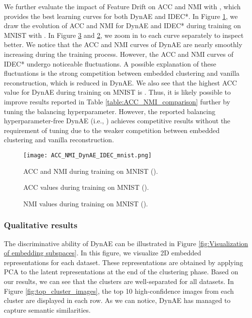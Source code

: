 \documentclass{article}
\begin{document}
We further evaluate the impact of Feature Drift on ACC and NMI with , which provides the best learning curves for both DynAE and IDEC*. In Figure \ref{fig:ACC_NMI_tunned_mnist}, we draw the evolution of ACC and NMI for DynAE and IDEC* during training on MNIST with . In Figure \ref{fig:NMI_tuned_MNIST} and \ref{fig:ACC_tuned_MNIST}, we zoom in to each curve separately to inspect better. We notice that the ACC and NMI curves of DynAE are nearly smoothly increasing during the training process. However, the ACC and NMI curves of IDEC* undergo noticeable fluctuations. A possible explanation of these fluctuations is the strong competition between embedded clustering and vanilla reconstruction, which is reduced in DynAE. We also see that the highest ACC value for DynAE during training on MNIST is . Thus, it is likely possible to improve results reported in Table \ref{table:ACC_NMI_comparison} further by tuning the balancing hyperparameter. However, the reported balancing hyperparameter-free DynAE (i.e., ) achieves competitive results without the requirement of tuning due to the weaker competition between embedded clustering and vanilla reconstruction.

\begin{figure}
\vskip 0.2in
\begin{center}
\centerline{\texttt{[image: ACC\_NMI\_DynAE\_IDEC\_mnist.png]}}
\caption{ACC and NMI during training on MNIST ().}
\label{fig:ACC_NMI_tunned_mnist}
\end{center}
\vskip -0.2in
\end{figure}

\begin{figure}
\vskip 0.2in
\centering
    \caption{ACC values during training on MNIST ().}
\vskip -0.2in
\label{fig:ACC_tuned_MNIST}
\end{figure}

\begin{figure}
\vskip 0.2in
\centering
    \caption{NMI values during training on MNIST ().}
\vskip -0.2in
\label{fig:NMI_tuned_MNIST}
\end{figure}

\subsubsection{Qualitative results}
The discriminative ability of DynAE can be illustrated in Figure \ref{fig:Visualization of embedding subspaces}. In this figure, we visualize 2D embedded representations for each dataset. These representations are obtained by applying PCA to the latent representations at the end of the clustering phase. Based on our results, we can see that the clusters are well-separated for all datasets. In Figure \ref{fig:top_cluster_images}, the top 10 high-confidence images from each cluster are displayed in each row. As we can notice, DynAE has managed to capture semantic similarities.
\end{document}
